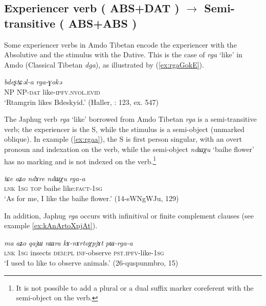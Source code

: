 \documentclass[oneside,a4paper,11pt]{article}
\makeatletter
\newcommand{\ipa}[1]{{\phon\textit{\mbox{#1}}}} %
\newcommand{\refb}[1]{(\ref{#1})}
\def\fakesc#1{%
  \begingroup%
  \xdef\fake@name{\csname\curr@fontshape/\f@size\endcsname}%
  \fontsize{\fontdimen8\fake@name}{\baselineskip}\selectfont%
  \uppercase{#1}%
  \endgroup%
}
\makeatother
\begin{document}
\subsection{Experiencer verb (\fakesc{abs+dat}) $\rightarrow$ Semi-transitive (\fakesc{abs+abs})}
Some experiencer verbs in Amdo Tibetan encode the experiencer with the Absolutive and the stimulus with the Dative. This is the case of \ipa{rga} `like' in Amdo (Classical Tibetan \ipa{dga}), as illustrated by \refb{ex:rgaGokE}.

\begin{exe}
\ex \label{ex:rgaGokE}
\gll \ipa{ʂtamɖʐən}  \ipa{bdeʂtɕəl-a}  \ipa{rga-ɣokə} \\
NP NP-\textsc{dat} like-\textsc{ipfv.nvol.evid} \\
\glt `Rtamgrin likes Bdeskyid.' (Haller, \citeyear{haller04themchen}: 123, ex. 547)
\end{exe}

The Japhug verb \ipa{rga} `like' borrowed from Amdo Tibetan \ipa{rga} is a semi-transitive verb; the experiencer is the S, while the stimulus is a semi-object (unmarked oblique). In example \refb{ex:rgaa}, the S is first person singular,  with an overt pronoun and indexation on the verb, while the semi-object \ipa{ndɯχu} `baihe flower' has no marking and is not indexed on the verb.\footnote{It is not possible to add a plural or a dual suffix marker coreferent with the semi-object on the verb.}  

\begin{exe}
\ex \label{ex:rgaa}
\gll
\ipa{tɕe} 	\ipa{aʑo} 	\ipa{ndɤre} 	\ipa{ndɯχu} 	\ipa{rga-a} \\
\textsc{lnk} \textsc{1sg} \textsc{top} baihe like:\textsc{fact}-\textsc{1sg} \\
\glt `As for me, I like the baihe flower.' (14-sWNgWJu, 129)
\end{exe}


In addition, Japhug \ipa{rga}  occurs with infinitival or finite complement clauses (see example \ref{ex:kAnArtoXpjAt}).

\begin{exe}
\ex \label{ex:kAnArtoXpjAt}
\gll  
\ipa{ma} 	\ipa{aʑo} 	\ipa{qajɯ} 	\ipa{nɯra} 	\ipa{kɤ-nɤrtoχpjɤt} 	\ipa{pɯ-rga-a} \\
\textsc{lnk} \textsc{1sg} insects \textsc{dem:pl} \textsc{inf}-observe \textsc{pst.ipfv}-like-\textsc{1sg} \\
\glt `I used to like to observe animals.' (26-quspunmbro, 15)
\end{exe}
\end{document}
